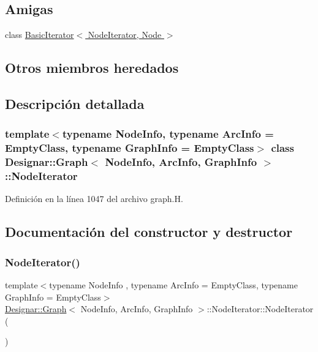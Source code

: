 \subsection*{Amigas}
\begin{DoxyCompactItemize}
\item 
class \hyperlink{class_designar_1_1_graph_1_1_node_iterator_a21dc6ae614d097ff896e9e8e422d8f3c}{Basic\+Iterator$<$ Node\+Iterator, Node $>$}
\end{DoxyCompactItemize}
\subsection*{Otros miembros heredados}


\subsection{Descripción detallada}
\subsubsection*{template$<$typename Node\+Info, typename Arc\+Info = Empty\+Class, typename Graph\+Info = Empty\+Class$>$\newline
class Designar\+::\+Graph$<$ Node\+Info, Arc\+Info, Graph\+Info $>$\+::\+Node\+Iterator}



Definición en la línea 1047 del archivo graph.\+H.



\subsection{Documentación del constructor y destructor}
\mbox{\label{class_designar_1_1_graph_1_1_node_iterator_a0449a6ba6cd5d43c04567210a8a064b1}} 
\subsubsection{\texorpdfstring{Node\+Iterator()}{NodeIterator()}\hspace{0.1cm}{\footnotesize\ttfamily [1/5]}}
{\footnotesize\ttfamily template$<$typename Node\+Info , typename Arc\+Info  = Empty\+Class, typename Graph\+Info  = Empty\+Class$>$ \\
\hyperlink{class_designar_1_1_graph}{Designar\+::\+Graph}$<$ Node\+Info, Arc\+Info, Graph\+Info $>$\+::Node\+Iterator\+::\+Node\+Iterator (\begin{DoxyParamCaption}{ }\end{DoxyParamCaption})\hspace{0.3cm}{\ttfamily [inline]}}



